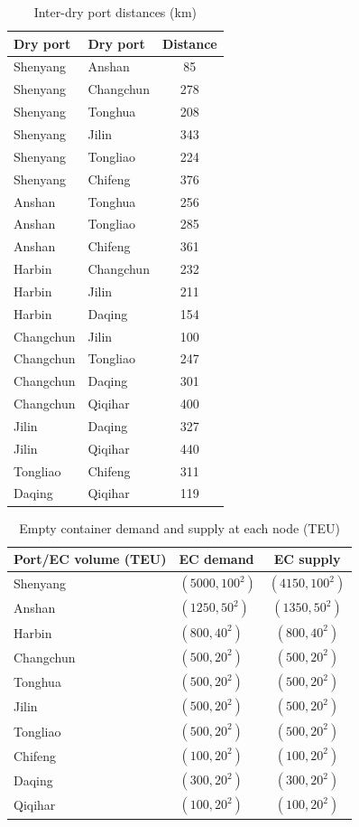 \documentclass[preprint,12pt]{elsarticle}
\begin{document}
\begin{table}[htbp]
\centering
\caption{Inter-dry port distances (km)}
\label{tab:inter_dryport_distance}
\begin{tabular*}{0.65\textwidth}{@{\extracolsep{\fill}}llc@{}}
\hline
Dry port  & Dry port  & Distance \\
\hline
Shenyang   & Anshan    & 85  \\
Shenyang   & Changchun & 278 \\
Shenyang   & Tonghua   & 208 \\
Shenyang   & Jilin     & 343 \\
Shenyang   & Tongliao  & 224 \\
Shenyang   & Chifeng   & 376 \\
Anshan     & Tonghua   & 256 \\
Anshan     & Tongliao  & 285 \\
Anshan     & Chifeng   & 361 \\
Harbin     & Changchun & 232 \\
Harbin     & Jilin     & 211 \\
Harbin     & Daqing    & 154 \\
Changchun  & Jilin     & 100 \\
Changchun  & Tongliao  & 247 \\
Changchun  & Daqing    & 301 \\
Changchun  & Qiqihar   & 400 \\
Jilin      & Daqing    & 327 \\
Jilin      & Qiqihar   & 440 \\
Tongliao   & Chifeng   & 311 \\
Daqing     & Qiqihar   & 119 \\
\hline
\end{tabular*}
\end{table}

\begin{table}[htbp]
\centering
\caption{Empty container demand and supply at each node (TEU)}
\label{tab:ec_demand_supply}
\begin{tabular*}{0.65\textwidth}{@{\extracolsep{\fill}}llc@{}}
\hline
Port/EC volume (TEU) & EC demand & EC supply \\
\hline
Shenyang & $(5000, 100^2)$ & $(4150, 100^2)$ \\
Anshan & $(1250, 50^2)$ & $(1350, 50^2)$ \\
Harbin & $(800, 40^2)$ & $(800, 40^2)$ \\
Changchun & $(500, 20^2)$ & $(500, 20^2)$ \\
Tonghua & $(500, 20^2)$ & $(500, 20^2)$ \\
Jilin & $(500, 20^2)$ & $(500, 20^2)$ \\
Tongliao & $(500, 20^2)$ & $(500, 20^2)$ \\
Chifeng & $(100, 20^2)$ & $(100, 20^2)$ \\
Daqing & $(300, 20^2)$ & $(300, 20^2)$ \\
Qiqihar & $(100, 20^2)$ & $(100, 20^2)$ \\
\hline
\end{tabular*}
\end{table}
\clearpage
\end{document}
